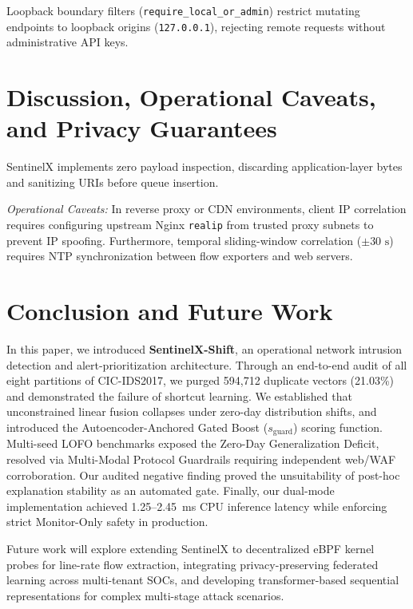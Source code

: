 \documentclass[conference]{IEEEtran}
\begin{document}
Loopback boundary filters (\texttt{require\_local\_or\_admin}) restrict mutating endpoints to loopback origins (\texttt{127.0.0.1}), rejecting remote requests without administrative API keys.

\section{Discussion, Operational Caveats, and Privacy Guarantees}
SentinelX implements zero payload inspection, discarding application-layer bytes and sanitizing URIs before queue insertion. 

\textit{Operational Caveats:} In reverse proxy or CDN environments, client IP correlation requires configuring upstream Nginx \texttt{realip} from trusted proxy subnets to prevent IP spoofing. Furthermore, temporal sliding-window correlation ($\pm 30\text{ s}$) requires NTP synchronization between flow exporters and web servers.

\section{Conclusion and Future Work}
In this paper, we introduced \textbf{SentinelX-Shift}, an operational network intrusion detection and alert-prioritization architecture. Through an end-to-end audit of all eight partitions of CIC-IDS2017, we purged 594,712 duplicate vectors (21.03\%) and demonstrated the failure of shortcut learning. We established that unconstrained linear fusion collapses under zero-day distribution shifts, and introduced the Autoencoder-Anchored Gated Boost ($s_{\text{guard}}$) scoring function. Multi-seed LOFO benchmarks exposed the Zero-Day Generalization Deficit, resolved via Multi-Modal Protocol Guardrails requiring independent web/WAF corroboration. Our audited negative finding proved the unsuitability of post-hoc explanation stability as an automated gate. Finally, our dual-mode implementation achieved 1.25--2.45~ms CPU inference latency while enforcing strict Monitor-Only safety in production.

Future work will explore extending SentinelX to decentralized eBPF kernel probes for line-rate flow extraction, integrating privacy-preserving federated learning across multi-tenant SOCs, and developing transformer-based sequential representations for complex multi-stage attack scenarios.
\end{document}

